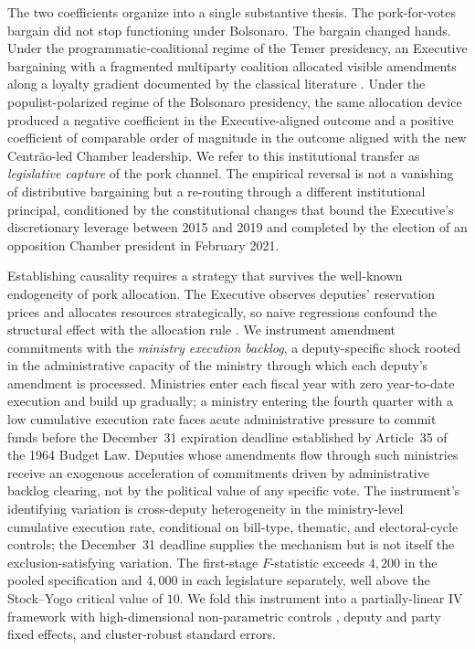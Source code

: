 \documentclass[preprint,12pt,authoryear]{elsarticle}
\begin{document}
The two coefficients organize into a single substantive thesis. The pork-for-votes bargain did not stop functioning under Bolsonaro. The bargain changed hands. Under the programmatic-coalitional regime of the Temer presidency, an Executive bargaining with a fragmented multiparty coalition allocated visible amendments along a loyalty gradient documented by the classical literature \citep{PereiraAndMueller2004,Raile2011}. Under the populist-polarized regime of the Bolsonaro presidency, the same allocation device produced a negative coefficient in the Executive-aligned outcome and a positive coefficient of comparable order of magnitude in the outcome aligned with the new Centr\~ao-led Chamber leadership. We refer to this institutional transfer as \emph{legislative capture} of the pork channel. The empirical reversal is not a vanishing of distributive bargaining but a re-routing through a different institutional principal, conditioned by the constitutional changes that bound the Executive's discretionary leverage between 2015 and 2019 and completed by the election of an opposition Chamber president in February 2021.

Establishing causality requires a strategy that survives the well-known endogeneity of pork allocation. The Executive observes deputies' reservation prices and allocates resources strategically, so naive regressions confound the structural effect with the allocation rule \citep{BerryGrosscloseMilyo2000,DesposatoCOE2006}. We instrument amendment commitments with the \emph{ministry execution backlog}, a deputy-specific shock rooted in the administrative capacity of the ministry through which each deputy's amendment is processed. Ministries enter each fiscal year with zero year-to-date execution and build up gradually; a ministry entering the fourth quarter with a low cumulative execution rate faces acute administrative pressure to commit funds before the December~31 expiration deadline established by Article~35 of the 1964 Budget Law. Deputies whose amendments flow through such ministries receive an exogenous acceleration of commitments driven by administrative backlog clearing, not by the political value of any specific vote. The instrument's identifying variation is cross-deputy heterogeneity in the ministry-level cumulative execution rate, conditional on bill-type, thematic, and electoral-cycle controls; the December~31 deadline supplies the mechanism but is not itself the exclusion-satisfying variation. The first-stage $F$-statistic exceeds $4{,}200$ in the pooled specification and $4{,}000$ in each legislature separately, well above the Stock--Yogo critical value of $10$. We fold this instrument into a partially-linear IV framework with high-dimensional non-parametric controls \citep{Chernozhukov2018}, deputy and party fixed effects, and cluster-robust standard errors.
\end{document}

